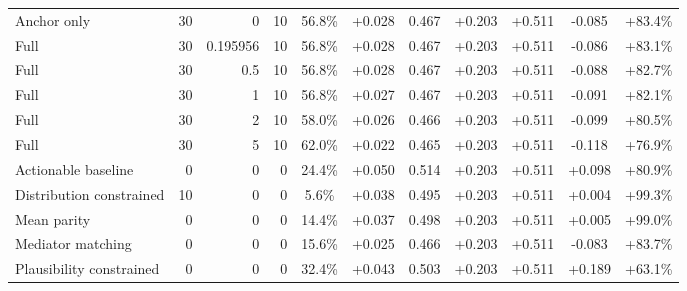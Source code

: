 \begin{table}[htbp]
\begin{tabular}{lrrrccccccc}
Anchor only & 30 & 0 & 10 & 56.8\% & +0.028 & 0.467 & +0.203 & +0.511 & -0.085 & +83.4\% \\
Full & 30 & 0.195956 & 10 & 56.8\% & +0.028 & 0.467 & +0.203 & +0.511 & -0.086 & +83.1\% \\
Full & 30 & 0.5 & 10 & 56.8\% & +0.028 & 0.467 & +0.203 & +0.511 & -0.088 & +82.7\% \\
Full & 30 & 1 & 10 & 56.8\% & +0.027 & 0.467 & +0.203 & +0.511 & -0.091 & +82.1\% \\
Full & 30 & 2 & 10 & 58.0\% & +0.026 & 0.466 & +0.203 & +0.511 & -0.099 & +80.5\% \\
Full & 30 & 5 & 10 & 62.0\% & +0.022 & 0.465 & +0.203 & +0.511 & -0.118 & +76.9\% \\
Actionable baseline & 0 & 0 & 0 & 24.4\% & +0.050 & 0.514 & +0.203 & +0.511 & +0.098 & +80.9\% \\
Distribution constrained & 10 & 0 & 0 & 5.6\% & +0.038 & 0.495 & +0.203 & +0.511 & +0.004 & +99.3\% \\
Mean parity & 0 & 0 & 0 & 14.4\% & +0.037 & 0.498 & +0.203 & +0.511 & +0.005 & +99.0\% \\
Mediator matching & 0 & 0 & 0 & 15.6\% & +0.025 & 0.466 & +0.203 & +0.511 & -0.083 & +83.7\% \\
Plausibility constrained & 0 & 0 & 0 & 32.4\% & +0.043 & 0.503 & +0.203 & +0.511 & +0.189 & +63.1\% \\
\bottomrule
\end{tabular}
\end{table}
